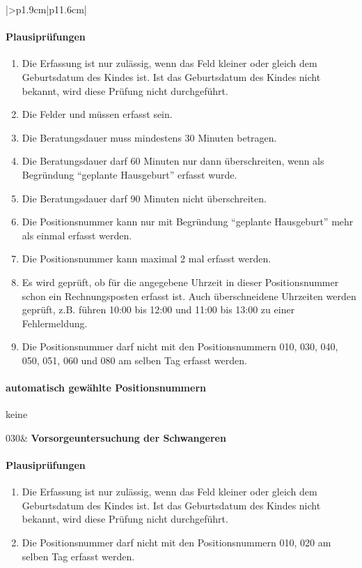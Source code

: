 \begin{mpsupertabular}{|>{\centering}p{1.9cm}|p{11.6cm}|}
\paragraph{Plausiprüfungen}
\begin{enumerate}
\item
Die Erfassung ist nur zulässig, wenn das Feld  kleiner 
oder gleich dem Geburtsdatum des Kindes ist. Ist das Geburtsdatum des
Kindes nicht bekannt, wird diese Prüfung nicht durchgeführt.
\item
Die Felder  und  müssen erfasst 
sein.
\item
Die Beratungsdauer muss mindestens 30 Minuten betragen.
\item
Die Beratungsdauer darf 60 Minuten nur dann überschreiten, wenn als
Begründung ``geplante Hausgeburt'' erfasst wurde.
\item
Die Beratungsdauer darf 90 Minuten nicht überschreiten.
\item
Die Positionsnummer kann nur mit Begründung ``geplante Hausgeburt'' mehr als
einmal erfasst werden.
\item
Die Positionsnummer kann maximal 2 mal erfasst werden.
\item
Es wird geprüft, ob für die angegebene Uhrzeit in dieser Positionsnummer
schon ein Rechnungsposten erfasst ist. Auch überschneidene Uhrzeiten
werden geprüft, z.B. führen 10:00 bis 12:00 und 11:00 bis 13:00 zu einer
Fehlermeldung.
\item
Die Positionsnummer darf nicht mit den Positionsnummern 010, 030, 040, 050,
051, 060 und 080 am selben Tag erfasst werden.
\end{enumerate}
\paragraph{automatisch gewählte Positionsnummern}
keine
\\ \hline



030&
\textbf{Vorsorgeuntersuchung der Schwangeren}
\paragraph{Plausiprüfungen}
\begin{enumerate}
\item
Die Erfassung ist nur zulässig, wenn das Feld  kleiner 
oder gleich dem Geburtsdatum des Kindes ist. Ist das Geburtsdatum des
Kindes nicht bekannt, wird diese Prüfung nicht durchgeführt.
\item
Die Positionsnummer darf nicht mit den Positionsnummern 010, 020 am
selben Tag erfasst werden.
\end{enumerate}

\end{mpsupertabular}
